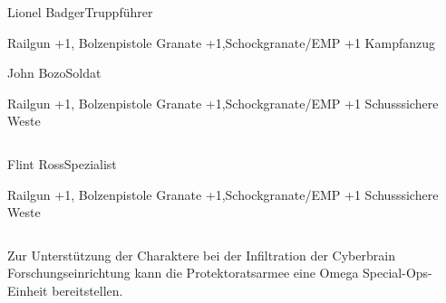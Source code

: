 \begin{column}[l]{0.45}
    \begin{nscsheet}[h]{Lionel Badger\newline{}Truppführer}
        \nscstats[ATT=2,AGG=2]
        \nscruler
        \begin{nscinventory}
            \nscitem[Waffen] Railgun +1, Bolzenpistole
            \nscitem[Granaten] Granate +1,\newline{}Schockgranate/EMP +1
            \nscitem[Rüstung] Kampfanzug
        \end{nscinventory}
    \end{nscsheet}

    \begin{nscsheet}[h]{John Bozo\newline{}Soldat}
        \nscstats[ATT=2,AGG=2]
        \nscruler
        \begin{nscinventory}
            \nscitem[Waffen] Railgun +1, Bolzenpistole
            \nscitem[Granaten] Granate +1,\newline{}Schockgranate/EMP +1
            \nscitem[Rüstung] Schusssichere Weste
        \end{nscinventory}
    \end{nscsheet}
\end{column}
\begin{column}[r]{0.45}
    \begin{nscsheet}[h]{Flint Ross\newline{}Spezialist}
        \nscstats[ATT=2,AGG=1,DEX=3]
        \nscruler
        \begin{nscinventory}
            \nscitem[Waffen] Railgun +1, Bolzenpistole
            \nscitem[Granaten] Granate +1,\newline{}Schockgranate/EMP +1
            \nscitem[Rüstung] Schusssichere Weste
        \end{nscinventory}
    \end{nscsheet}
\end{column}
\vfill

\pagebreak
{}

Zur Unterstützung der Charaktere bei der Infiltration der Cyberbrain Forschungseinrichtung kann die Protektoratsarmee eine 
Omega Special-Ops-Einheit bereitstellen.

